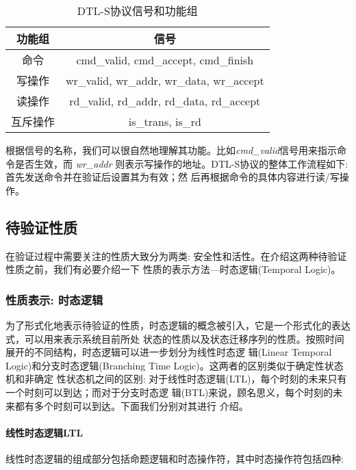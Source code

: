 \begin{table}[ht]
  \caption{DTL-S协议信号和功能组}
  \label{tab:dtl}
  \centering
  \begin{tabular}{c | c}
   \toprule[1.5pt]
    功能组  & 信号\\ [0.5ex]
    \hline
    命令    & cmd\_valid, cmd\_accept, cmd\_finish\\
    \hline
    写操作  & wr\_valid, wr\_addr, wr\_data, wr\_accept\\
    \hline
    读操作  & rd\_valid, rd\_addr, rd\_data, rd\_accept\\
    \hline
    互斥操作  & is\_trans, is\_rd\\
   \bottomrule[1.5pt]
 \end{tabular}
\end{table}

根据信号的名称，我们可以很自然地理解其功能。比如{\em cmd\_valid}信号用来指示命令是否生效，而{\em
  wr\_addr} 则表示写操作的地址。DTL-S协议的整体工作流程如下: 首先发送命令并在验证后设置其为有效；然
后再根据命令的具体内容进行读/写操作。

\subsection{待验证性质}
\label{sec:hierarchy-puv}
在验证过程中需要关注的性质大致分为两类: 安全性和活性。在介绍这两种待验证性质之前，我们有必要介绍一下
性质的表示方法---时态逻辑(Temporal Logic)。

\subsubsection{性质表示: 时态逻辑}
\label{sec:temporal-logic}
为了形式化地表示待验证的性质，时态逻辑的概念被引入，它是一个形式化的表达式，可以用来表示系统目前所处
状态的性质以及状态迁移序列的性质。按照时间展开的不同结构，时态逻辑可以进一步划分为线性时态逻
辑(Linear Temporal Logic)和分支时态逻辑(Branching Time Logic)。这两者的区别类似于确定性状态机和非确定
性状态机之间的区别: 对于线性时态逻辑(LTL)，每个时刻的未来只有一个时刻可以到达；而对于分支时态逻
辑(BTL)\cite{AASPPL83_Clarke}来说，顾名思义，每个时刻的未来都有多个时刻可以到达。下面我们分别对其进行
介绍。

\paragraph{线性时态逻辑LTL}
\label{sec:ltl}

线性时态逻辑的组成部分包括命题逻辑和时态操作符，其中时态操作符包括四种\cite{Book_Bianjn}:

